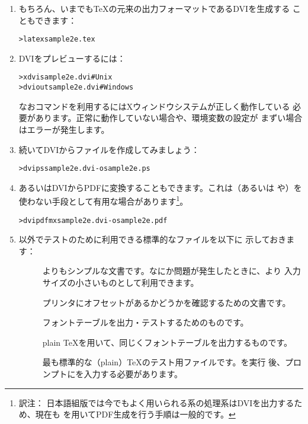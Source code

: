 \documentclass[uplatex,dvipdfmx,12pt]{jsarticle}
\begin{document}
\begin{enumerate}
\item もちろん、いまでも\TeX の元来の出力フォーマットであるDVIを生成する
こともできます：
%
\begin{alltt}
> latex sample2e.tex
\end{alltt}

\item DVIをプレビューするには：
%
\begin{alltt}
> xdvi sample2e.dvi    # Unix
> dviout sample2e.dvi  # Windows
\end{alltt}
%
なおコマンドを利用するにはXウィンドウシステムが正しく動作している
必要があります。正常に動作していない場合や、環境変数の設定が
まずい場合はエラーが発生します。

\item 続いてDVIから\PS ファイルを作成してみましょう：
%
\begin{alltt}
> dvips sample2e.dvi -o sample2e.ps
\end{alltt}

\item あるいはDVIからPDFに変換することもできます。これは\pdfTeX （あるいは
\XeTeX や\LuaTeX）を使わない手段として有用な場合があります\footnote{訳注：
日本語組版では今でもよく用いられる\pTeX 系の処理系はDVIを出力するため、現在も
を用いてPDF生成を行う手順は一般的です。}。
%
\begin{alltt}
> dvipdfmx sample2e.dvi -o sample2e.pdf
\end{alltt}

\item {}以外でテストのために利用できる標準的なファイルを以下に
示しておきます：
%
\begin{description}
\item []
よりもシンプルな文書です。なにか問題が発生したときに、より
入力サイズの小さいものとして利用できます。

\item []
プリンタにオフセットがあるかどうかを確認するための文書です。

\item []
フォントテーブルを出力・テストするためのものです。

\item []
plain \TeX を用いて、同じくフォントテーブルを出力するものです。

\item []
最も標準的な（plain）\TeX のテスト用ファイルです。を実行
後、\code{*}プロンプトにを入力する必要があります。
\end{description}


\end{enumerate}
\end{document}

